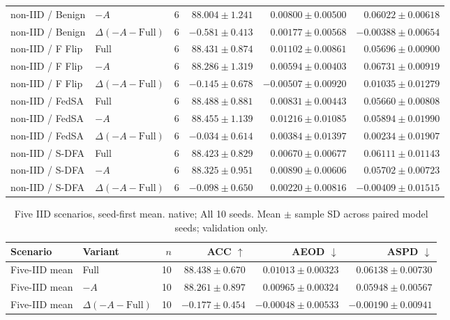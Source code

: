 \begin{table}[t]
\begin{tabular}{llrrrr}
non-IID / Benign & $-A$ & 6 & $88.004 \pm 1.241$ & $0.00800 \pm 0.00500$ & $0.06022 \pm 0.00618$ \\
non-IID / Benign & $\Delta(-A-\mathrm{Full})$ & 6 & $-0.581 \pm 0.413$ & $0.00177 \pm 0.00568$ & $-0.00388 \pm 0.00654$ \\
non-IID / F Flip & Full & 6 & $88.431 \pm 0.874$ & $0.01102 \pm 0.00861$ & $0.05696 \pm 0.00900$ \\
non-IID / F Flip & $-A$ & 6 & $88.286 \pm 1.319$ & $0.00594 \pm 0.00403$ & $0.06731 \pm 0.00919$ \\
non-IID / F Flip & $\Delta(-A-\mathrm{Full})$ & 6 & $-0.145 \pm 0.678$ & $-0.00507 \pm 0.00920$ & $0.01035 \pm 0.01279$ \\
non-IID / FedSA & Full & 6 & $88.488 \pm 0.881$ & $0.00831 \pm 0.00443$ & $0.05660 \pm 0.00808$ \\
non-IID / FedSA & $-A$ & 6 & $88.455 \pm 1.139$ & $0.01216 \pm 0.01085$ & $0.05894 \pm 0.01990$ \\
non-IID / FedSA & $\Delta(-A-\mathrm{Full})$ & 6 & $-0.034 \pm 0.614$ & $0.00384 \pm 0.01397$ & $0.00234 \pm 0.01907$ \\
non-IID / S-DFA & Full & 6 & $88.423 \pm 0.829$ & $0.00670 \pm 0.00677$ & $0.06111 \pm 0.01143$ \\
non-IID / S-DFA & $-A$ & 6 & $88.325 \pm 0.951$ & $0.00890 \pm 0.00606$ & $0.05702 \pm 0.00723$ \\
non-IID / S-DFA & $\Delta(-A-\mathrm{Full})$ & 6 & $-0.098 \pm 0.650$ & $0.00220 \pm 0.00816$ & $-0.00409 \pm 0.01515$ \\
\bottomrule
\end{tabular}
\end{table}

\begin{table}[t]
\centering
\small
\caption{Five IID scenarios, seed-first mean. native; All 10 seeds. Mean $\pm$ sample SD across paired model seeds; validation only.}
\begin{tabular}{llrrrr}
\toprule
Scenario & Variant & $n$ & ACC $\uparrow$ & AEOD $\downarrow$ & ASPD $\downarrow$ \\
\midrule
Five-IID mean & Full & 10 & $88.438 \pm 0.670$ & $0.01013 \pm 0.00323$ & $0.06138 \pm 0.00730$ \\
Five-IID mean & $-A$ & 10 & $88.261 \pm 0.897$ & $0.00965 \pm 0.00324$ & $0.05948 \pm 0.00567$ \\
Five-IID mean & $\Delta(-A-\mathrm{Full})$ & 10 & $-0.177 \pm 0.454$ & $-0.00048 \pm 0.00533$ & $-0.00190 \pm 0.00941$ \\
\bottomrule
\end{tabular}
\end{table}

